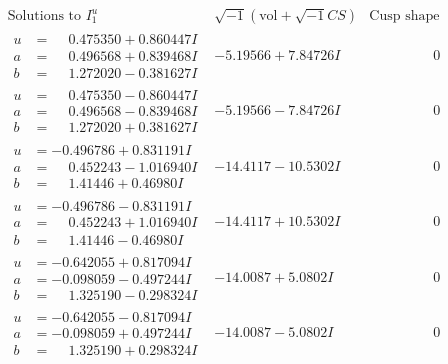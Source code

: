 \documentclass[1p]{elsarticle_modified}
\theoremstyle{definition}
\newcommand{\I}{\sqrt{-1}}
\begin{document}
$$\begin{array}{c|c|c}  
\text{Solutions to }I^u_{1}& \I (\text{vol} + \sqrt{-1}CS) & \text{Cusp shape}\\
 \hline 
\begin{aligned}
u &= \phantom{-}0.475350 + 0.860447 I \\
a &= \phantom{-}0.496568 + 0.839468 I \\
b &= \phantom{-}1.272020 - 0.381627 I\end{aligned}
 & -5.19566 + 7.84726 I & \phantom{-0.000000 } 0 \\ \hline\begin{aligned}
u &= \phantom{-}0.475350 - 0.860447 I \\
a &= \phantom{-}0.496568 - 0.839468 I \\
b &= \phantom{-}1.272020 + 0.381627 I\end{aligned}
 & -5.19566 - 7.84726 I & \phantom{-0.000000 } 0 \\ \hline\begin{aligned}
u &= -0.496786 + 0.831191 I \\
a &= \phantom{-}0.452243 - 1.016940 I \\
b &= \phantom{-}1.41446 + 0.46980 I\end{aligned}
 & -14.4117 - 10.5302 I & \phantom{-0.000000 } 0 \\ \hline\begin{aligned}
u &= -0.496786 - 0.831191 I \\
a &= \phantom{-}0.452243 + 1.016940 I \\
b &= \phantom{-}1.41446 - 0.46980 I\end{aligned}
 & -14.4117 + 10.5302 I & \phantom{-0.000000 } 0 \\ \hline\begin{aligned}
u &= -0.642055 + 0.817094 I \\
a &= -0.098059 - 0.497244 I \\
b &= \phantom{-}1.325190 - 0.298324 I\end{aligned}
 & -14.0087 + 5.0802 I & \phantom{-0.000000 } 0 \\ \hline\begin{aligned}
u &= -0.642055 - 0.817094 I \\
a &= -0.098059 + 0.497244 I \\
b &= \phantom{-}1.325190 + 0.298324 I\end{aligned}
 & -14.0087 - 5.0802 I & \phantom{-0.000000 } 0 \\ \hline\begin{aligned}

\end{aligned}
\end{array}$$
\end{document}
